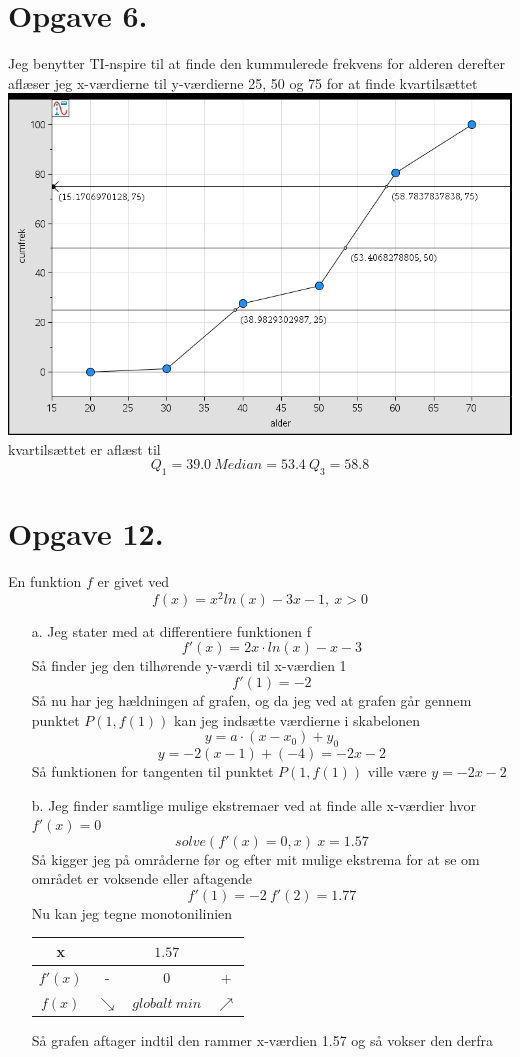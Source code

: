 \documentclass[12pt]{article}
\begin{document}
\section*{Opgave 6.}
  Jeg benytter TI-nspire til at finde den kummulerede frekvens for alderen
  derefter aflæser jeg x-værdierne til y-værdierne 25, 50 og 75 for at finde
  kvartilsættet\\
  \includegraphics[width=\textwidth]{sumkurve.png}
  kvartilsættet er aflæst til\\
  $$Q_1=39.0 \ Median=53.4 \ Q_3=58.8$$

\section*{Opgave 12.}
  En funktion $f$ er givet ved
  $$f(x)=x^2 ln(x)-3x-1, \ x>0$$
  \begin{enumerate}
    \item[a.] Jeg stater med at differentiere funktionen f
    $$f'(x)=2x \cdot ln(x)-x-3$$
    Så finder jeg den tilhørende y-værdi til x-værdien 1
    $$f'(1)=-2$$
    Så nu har jeg hældningen af grafen, og da jeg ved at grafen går gennem
    punktet $P(1, f(1))$ kan jeg indsætte værdierne i skabelonen
    $$y=a \cdot (x-x_{0}) + y_{0}$$
    $$y=-2(x-1)+(-4)=-2x-2$$
    Så funktionen for tangenten til punktet $P(1, f(1))$ ville være $y=-2x-2$

    \item[b.] Jeg finder samtlige mulige ekstremaer ved at finde alle x-værdier hvor $f'(x)=0$
    $$solve(f'(x)=0,x) \ x=1.57$$
    Så kigger jeg på områderne før og efter mit mulige ekstrema for at se om området er voksende eller aftagende
    $$f'(1)=-2 \ f'(2)=1.77$$
    Nu kan jeg tegne monotonilinien
    \begin{center}
      \begin{tabular}{c c c c}
        x && $1.57$ &\\
        \hline
        $f'(x)$ & - & 0 & +\\
        $f(x)$ & $\searrow$ & $globalt \ min$ & $\nearrow$
      \end{tabular}
    \end{center}
    Så grafen aftager indtil den rammer x-værdien 1.57 og så vokser den derfra
  \end{enumerate}
\end{document}

